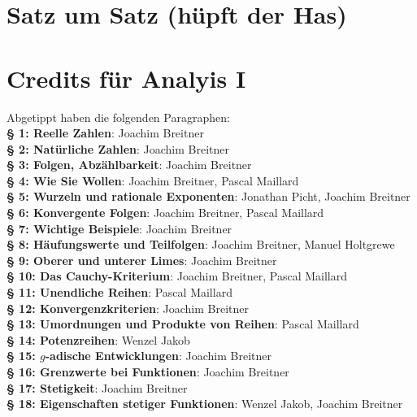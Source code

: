 \documentclass[a4paper,twoside,DIV15,BCOR12mm]{scrbook}
\begin{document}
\appendix
\chapter{Satz um Satz (hüpft der Has)}

\renewcommand{\indexname}{Stichwortverzeichnis}
\printindex

\chapter{Credits für Analyis I} Abgetippt haben die folgenden Paragraphen:\\%
\textbf{§ 1: Reelle Zahlen}: Joachim Breitner\\
\textbf{§ 2: Natürliche Zahlen}: Joachim Breitner\\
\textbf{§ 3: Folgen, Abzählbarkeit}: Joachim Breitner\\
\textbf{§ 4: Wie Sie Wollen}: Joachim Breitner, Pascal Maillard\\
\textbf{§ 5: Wurzeln und rationale Exponenten}: Jonathan Picht, Joachim Breitner\\
\textbf{§ 6: Konvergente Folgen}: Joachim Breitner, Pascal Maillard\\
\textbf{§ 7: Wichtige Beispiele}: Joachim Breitner\\
\textbf{§ 8: Häufungswerte und Teilfolgen}: Joachim Breitner, Manuel Holtgrewe\\
\textbf{§ 9: Oberer und unterer Limes}: Joachim Breitner\\
\textbf{§ 10: Das Cauchy-Kriterium}: Joachim Breitner, Pascal Maillard\\
\textbf{§ 11: Unendliche Reihen}: Pascal Maillard\\
\textbf{§ 12: Konvergenzkriterien}: Joachim Breitner\\
\textbf{§ 13: Umordnungen und Produkte von Reihen}: Pascal Maillard\\
\textbf{§ 14: Potenzreihen}: Wenzel Jakob\\
\textbf{§ 15: $g$-adische Entwicklungen}: Joachim Breitner\\
\textbf{§ 16: Grenzwerte bei Funktionen}: Joachim Breitner\\
\textbf{§ 17: Stetigkeit}: Joachim Breitner\\
\textbf{§ 18: Eigenschaften stetiger Funktionen}: Wenzel Jakob, Joachim Breitner\\
\end{document}

